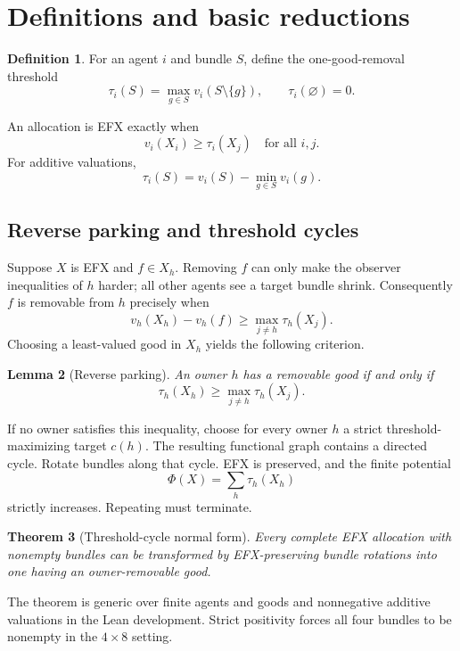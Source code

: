 \documentclass[11pt]{article}
\newtheorem{theorem}{Theorem}[section]
\newtheorem{lemma}[theorem]{Lemma}
\theoremstyle{definition}
\newtheorem{definition}[theorem]{Definition}
\begin{document}
\section{Definitions and basic reductions}

\begin{definition}
For an agent $i$ and bundle $S$, define the one-good-removal threshold
\[
  \tau_i(S)=\max_{g\in S} v_i(S\setminus\{g\}),\qquad
  \tau_i(\varnothing)=0.
\]
\end{definition}

An allocation is EFX exactly when
\[
  v_i(X_i)\ge \tau_i(X_j)
  \quad\text{for all }i,j.
\]
For additive valuations,
\[
  \tau_i(S)=v_i(S)-\min_{g\in S}v_i(g).
\]

\subsection{Reverse parking and threshold cycles}

Suppose $X$ is EFX and $f\in X_h$. Removing $f$ can only make the observer
inequalities of $h$ harder; all other agents see a target bundle shrink.
Consequently $f$ is removable from $h$ precisely when
\[
  v_h(X_h)-v_h(f)\ge \max_{j\ne h}\tau_h(X_j).
\]
Choosing a least-valued good in $X_h$ yields the following criterion.

\begin{lemma}[Reverse parking]\label{lem:parking}
An owner $h$ has a removable good if and only if
\[
  \tau_h(X_h)\ge\max_{j\ne h}\tau_h(X_j).
\]
\end{lemma}

If no owner satisfies this inequality, choose for every owner $h$ a strict
threshold-maximizing target $c(h)$. The resulting functional graph contains a
directed cycle. Rotate bundles along that cycle. EFX is preserved, and the
finite potential
\[
  \Phi(X)=\sum_h\tau_h(X_h)
\]
strictly increases. Repeating must terminate.

\begin{theorem}[Threshold-cycle normal form]\label{thm:cycle}
Every complete EFX allocation with nonempty bundles can be transformed by
EFX-preserving bundle rotations into one having an owner-removable good.
\end{theorem}

The theorem is generic over finite agents and goods and nonnegative additive
valuations in the Lean development. Strict positivity forces all four bundles
to be nonempty in the $4\times8$ setting.
\end{document}
